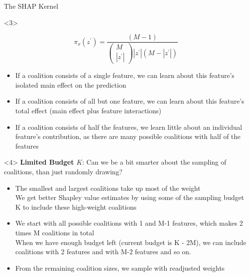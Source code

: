 \documentclass[11pt,compress,t,notes=noshow, aspectratio=169, xcolor=table]{beamer}
\begin{document}
\begin{vbframe}{The SHAP Kernel}
\begin{onlyenv}<3>

$$\pi_{x}\left(z^{\prime}\right)=\frac{(M-1)}{\left(\begin{array}{c} M \\\left|z^{\prime}\right|\end{array}\right)\left|z^{\prime}\right|\left(M-\left|z^{\prime}\right|\right)}$$

\begin{itemize}
    \item If a coalition consists of a single feature, we can learn about this feature’s isolated main effect on the prediction
    \item If a coalition consists of all but one feature, we can learn about this feature’s total effect (main effect plus feature interactions)
    \item If a coalition consists of half the features, we learn little about an individual feature’s contribution, as there are many possible coalitions with half of the features
\end{itemize}
\end{onlyenv}

\begin{onlyenv}<4>
\vspace{1cm}
\textbf{Limited Budget $K$}: Can we be a bit smarter about the sampling of coalitions, than just randomly drawing?
\begin{itemize}
    \item The smallest and largest coalitions take up most of the weight\\ We get better Shapley value estimates by using some of the sampling budget K to include these high-weight coalitions
    \item We start with all possible coalitions with 1 and M-1 features, which makes 2 times M coalitions in total\\ When we have enough budget left (current budget is K - 2M), we can include coalitions with 2 features and with M-2 features and so on.
    \item From the remaining coalition sizes, we sample with readjusted weights
\end{itemize}
\end{onlyenv}
  
\end{vbframe}
\end{document}
